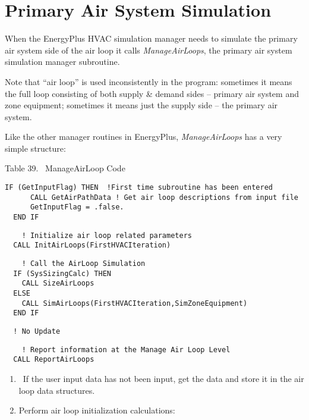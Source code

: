 \section{Primary Air System Simulation}\label{primary-air-system-simulation}

When the EnergyPlus HVAC simulation manager needs to simulate the primary air system side of the air loop it calls \emph{ManageAirLoops}, the primary air system simulation manager subroutine.

Note that ``air loop'' is used inconsistently in the program: sometimes it means the full loop consisting of both supply \& demand sides -- primary air system and zone equipment; sometimes it means just the supply side -- the primary air system.

Like the other manager routines in EnergyPlus, \emph{ManageAirLoops} has a very simple structure:

Table 39.~ ManageAirLoop Code

\begin{lstlisting}
IF (GetInputFlag) THEN  !First time subroutine has been entered
      CALL GetAirPathData ! Get air loop descriptions from input file
      GetInputFlag = .false.
  END IF
\end{lstlisting}

\begin{lstlisting}
    ! Initialize air loop related parameters
  CALL InitAirLoops(FirstHVACIteration)
\end{lstlisting}

\begin{lstlisting}
    ! Call the AirLoop Simulation
  IF (SysSizingCalc) THEN
    CALL SizeAirLoops
  ELSE
    CALL SimAirLoops(FirstHVACIteration,SimZoneEquipment)
  END IF
\end{lstlisting}

\begin{lstlisting}
  ! No Update
\end{lstlisting}

\begin{lstlisting}
    ! Report information at the Manage Air Loop Level
  CALL ReportAirLoops
\end{lstlisting}

\begin{enumerate}
\def\labelenumi{\arabic{enumi}.}
\item
  ~If the user input data has not been input, get the data and store it in the air loop data structures.
\item
  Perform air loop initialization calculations:
\end{enumerate}


